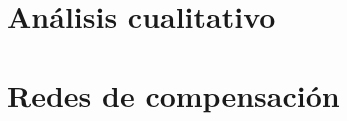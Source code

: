 \section{Análisis cualitativo}
\resetallcounters

\clearpage

\section{Redes de compensación}
\resetallcounters

\clearpage



